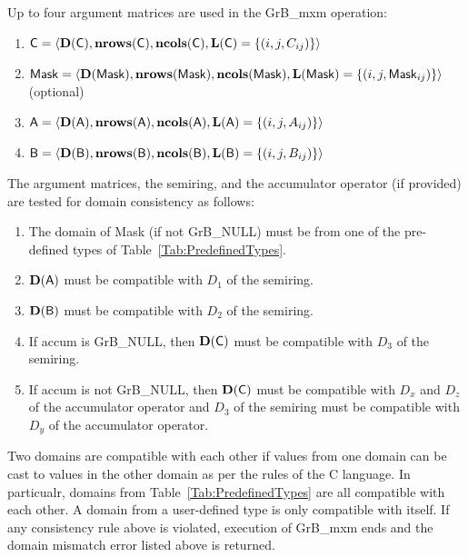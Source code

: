 Up to four argument matrices are used in the {\sf GrB\_mxm} operation:
\begin{enumerate}
\item ${\bf \sf C} = \langle \bold{D}({\sf C}),\bold{nrows}({\bf \sf C}),\bold{ncols}({\bf \sf C}),\bold{L}({\bf \sf C}) = \{(i,j,C_{ij}) \} \rangle$
\item ${\bf \sf Mask} = \langle \bold{D}({\sf Mask}),\bold{nrows}({\bf \sf Mask}),\bold{ncols}({\bf \sf Mask}),\bold{L}({\bf \sf Mask}) = \{(i,j,{\sf Mask}_{ij}) \} \rangle$ (optional)
\item ${\bf \sf A} = \langle \bold{D}({\sf A}),\bold{nrows}({\bf \sf A}), \bold{ncols}({\bf \sf A}),\bold{L}({\bf \sf A}) = \{(i,j,A_{ij}) \} \rangle$
\item ${\bf \sf B} = \langle \bold{D}({\sf B}),\bold{nrows}({\bf \sf B}), \bold{ncols}({\bf \sf B}),\bold{L}({\bf \sf B}) = \{(i,j,B_{ij}) \} \rangle$
\end{enumerate}

The argument matrices, the semiring, and the accumulator operator (if provided) are tested for domain consistency
as follows:
\begin{enumerate}

	\item The domain of {\sf Mask} (if not {\sf GrB\_NULL}) must be from one of the pre-defined types of Table~\ref{Tab:PredefinedTypes}.

	\item $\bold{D}({\bf \sf A})$ must be compatible with $D_1$ of the semiring.

	\item $\bold{D}({\bf \sf B})$ must be compatible with $D_2$ of the semiring.

	\item If {\sf accum} is {\sf GrB\_NULL}, then $\bold{D}({\bf \sf C})$ must be compatible with $D_3$ of the semiring.

	\item If {\sf accum} is not {\sf GrB\_NULL}, then $\bold{D}({\bf \sf C})$ must be compatible with $D_x$ and $D_z$ of the 
	accumulator operator and $D_3$ of the semiring must be compatible with $D_y$ of the accumulator operator.

\end{enumerate}
Two domains are compatible with each other if values from one domain can be cast to values in the other domain as per the rules of the C language.
In particualr, domains from Table~\ref{Tab:PredefinedTypes} are all compatible with each other. A domain from a user-defined type is only compatible with itself.
If any consistency rule above is violated, execution of {\sf GrB\_mxm} ends and the domain mismatch error listed above is returned.

